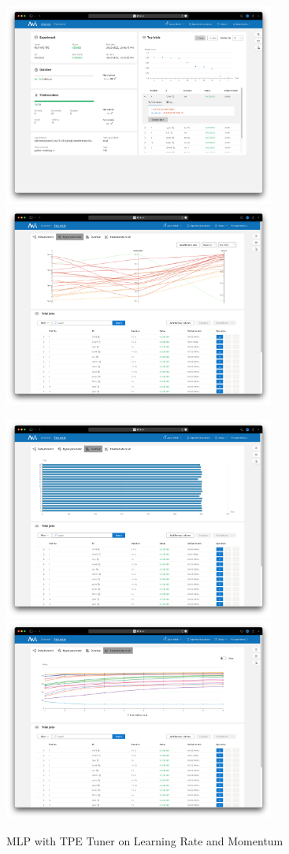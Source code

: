 \documentclass{article}
\begin{document}
\begin{figure}
    \centerline{\includegraphics[width=3.5in]{../proj3/figures/mlp_tpe_overview.png}\includegraphics[width=3.5in]{../proj3/figures/mlp_tpe_hyperparameter.png}}
    \centerline{\includegraphics[width=3.5in]{../proj3/figures/mlp_tpe_latency.png}\includegraphics[width=3.5in]{../proj3/figures/mlp_tpe_intermediate.png}}
    \caption{MLP with TPE Tuner on Learning Rate and Momentum}
    \label{fig:mlp-tpe}
\end{figure}
\end{document}
